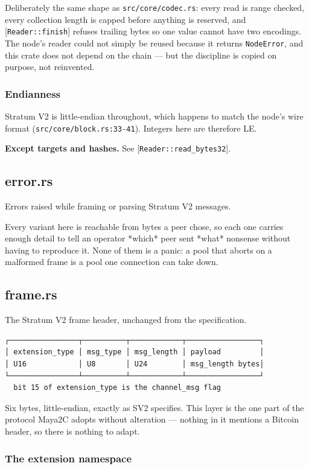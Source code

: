 \documentclass[11pt,a4paper]{article}
\begin{document}
Deliberately the same shape as \texttt{src/core/codec.rs}: every read is range
checked, every collection length is capped before anything is reserved, and
[\texttt{Reader::finish}] refuses trailing bytes so one value cannot have two
encodings. The node's reader could not simply be reused because it returns
\texttt{NodeError}, and this crate does not depend on the chain — but the
discipline is copied on purpose, not reinvented.

\subsubsection{Endianness}

Stratum V2 is little-endian throughout, which happens to match the node's
wire format (\texttt{src/core/block.rs:33-41}). Integers here are therefore LE.

\textbf{Except targets and hashes.} See [\texttt{Reader::read\_bytes32}].

\subsection{error.rs}
Errors raised while framing or parsing Stratum V2 messages.

Every variant here is reachable from bytes a peer chose, so each one carries
enough detail to tell an operator *which* peer sent *what* nonsense without
having to reproduce it. None of them is a panic: a pool that aborts on a
malformed frame is a pool one connection can take down.

\subsection{frame.rs}
The Stratum V2 frame header, unchanged from the specification.

\begin{verbatim}
┌────────────────┬──────────┬────────────┬─────────────────┐
│ extension_type │ msg_type │ msg_length │ payload         │
│ U16            │ U8       │ U24        │ msg_length bytes│
└────────────────┴──────────┴────────────┴─────────────────┘
  bit 15 of extension_type is the channel_msg flag
\end{verbatim}

Six bytes, little-endian, exactly as SV2 specifies. This layer is the one
part of the protocol Maya2C adopts without alteration — nothing in it
mentions a Bitcoin header, so there is nothing to adapt.

\subsubsection{The extension namespace}
\end{document}
